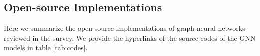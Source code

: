 \subsection{Open-source Implementations}
Here we summarize the open-source implementations of graph neural networks reviewed in the survey. We provide the hyperlinks of the source codes of the GNN models in table \ref{tab:codes}. 


	

